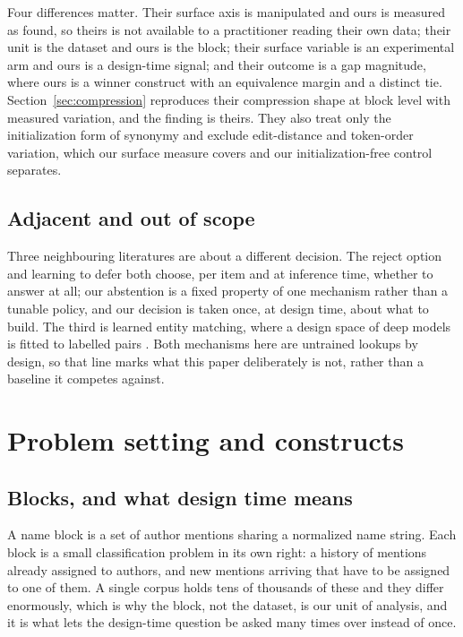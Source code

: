 \documentclass[11pt]{article}
\begin{document}
Four differences matter. Their surface axis is manipulated and ours is
measured as found, so theirs is not available to a practitioner reading their
own data; their unit is the dataset and ours is the block; their surface
variable is an experimental arm and ours is a design-time signal; and their
outcome is a gap magnitude, where ours is a winner construct with an
equivalence margin and a distinct tie. Section~\ref{sec:compression}
reproduces their compression shape at block level with measured variation, and
the finding is theirs. They also treat only the initialization form of
synonymy and exclude edit-distance and token-order variation, which our
surface measure covers and our initialization-free control separates.

\subsection{Adjacent and out of scope}
\label{sec:adjacent}

Three neighbouring literatures are about a different decision. The reject
option \citep{chow1970, hendrickx2024} and learning to defer
\citep{mozannarsontag2020} both choose, per item and at inference time,
whether to answer at all; our abstention is a fixed property of one mechanism
rather than a tunable policy, and our decision is taken once, at design time,
about what to build. The third is learned entity matching, where a design
space of deep models is fitted to labelled pairs \citep{mudgal2018}. Both
mechanisms here are untrained lookups by design, so that line marks what this
paper deliberately is not, rather than a baseline it competes against.

\section{Problem setting and constructs}
\label{sec:setting}

\subsection{Blocks, and what design time means}
\label{sec:blocks}

A name block is a set of author mentions sharing a normalized name string.
Each block is a small classification problem in its own right: a history of
mentions already assigned to authors, and new mentions arriving that have to
be assigned to one of them. A single corpus holds tens of thousands of these
and they differ enormously, which is why the block, not the dataset, is our
unit of analysis, and it is what lets the design-time question be asked many
times over instead of once.
\end{document}
